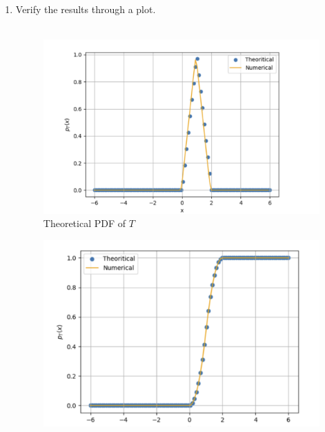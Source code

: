 \documentclass[journal,12pt,twocolumn]{IEEEtran}
\renewcommand\thesection{\arabic{section}}
\begin{document}
\begin{enumerate}[label=\thesection.\arabic*
,ref=\thesection.\theenumi]
\begin{align}
\begin{cases}
    x & \text{$0 < x < 1$} \\  
    2 - x & \text{$1 \leq x < 2$} \\
    0 & \text{$x > 2$}
    \end{cases}
\end{align}
Expression for CDF can be obtained by integrating $p_T(x)$ w.r.t. $X$
\begin{align}
    \displaystyle F_T(x) = \begin{cases} 
    0 & \text{$x \leq 0$} \\  
    \frac{x^2}{2} & \text{$0 < x < 1$} \\  
    -\frac{x^2}{2} + 2x - 1 & \text{$1 \leq x < 2$} \\
    1 & \text{$x > 2$}
    \end{cases}
\end{align}
\item Verify the results through a plot.\\
\solution\\
\begin{figure}[h!]
    \centering
    \includegraphics[width=\columnwidth]{figs/4.5pdf.png}
    \caption{Theoretical PDF of $T$}
    \label{fig:my_label}
\end{figure}
\begin{figure}[h!]
    \centering
    \includegraphics[width=\columnwidth]{figs/4.5cdf.png}

\end{figure}
\end{enumerate}
\end{document}

